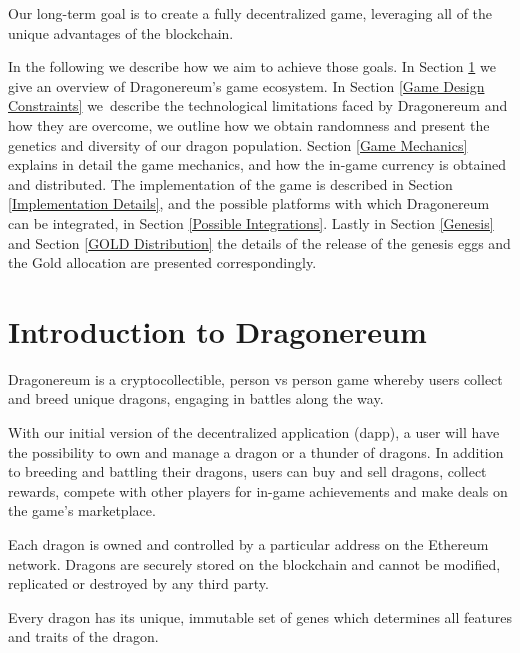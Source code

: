 \documentclass[12pt]{article}
\begin{document}
Our long-term goal is to create a fully decentralized game, leveraging all of the unique advantages of the blockchain.\par

In the following we describe how we aim to achieve those goals. In Section \ref{Introduction to Dragonereum} we give an overview of Dragonereum’s game ecosystem. In Section \ref{Game Design Constraints} we\ describe the technological limitations faced by Dragonereum and how they are overcome, we outline how we obtain randomness and present the genetics and diversity of our dragon population.  Section \ref{Game Mechanics} explains in detail the game mechanics, and how the in-game currency is obtained and distributed. The implementation of the game is described in Section \ref{Implementation Details}, and the possible platforms with which Dragonereum can be integrated, in Section \ref{Possible Integrations}. Lastly in Section \ref{Genesis} and Section \ref{GOLD Distribution} the details of the release of the genesis eggs and the Gold allocation are presented correspondingly.\par


\newpage
\vspace{\baselineskip}\section{Introduction to Dragonereum}
  \label{Introduction to Dragonereum}  \par

Dragonereum is a cryptocollectible, person vs person game whereby users collect and breed unique dragons, engaging in battles along the way.\par

With our initial version of the decentralized application (dapp), a user will have the possibility to own and manage a dragon or a thunder of dragons. In addition to breeding and battling their dragons, users can buy and sell dragons, collect rewards, compete with other players for in-game achievements and make deals on the game’s marketplace.\par

Each dragon is owned and controlled by a particular address on the Ethereum network. Dragons are securely stored on the blockchain and cannot be modified, replicated or destroyed by any third party.\par

Every dragon has its unique, immutable set of genes which determines all features and traits of the dragon.\par
\end{document}
